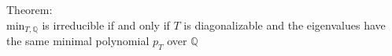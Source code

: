 \documentclass[preview]{standalone}
\begin{document}
\begin{center}
Theorem: \\ $\text{min}_{T, \mathbb{Q}}$ is irreducible if and only if $T$ is diagonalizable and the eigenvalues have the same minimal polynomial $p_T$ over $\mathbb{Q}$
\end{center}
\end{document}
